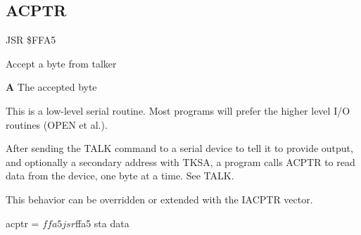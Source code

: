 \subsection{ACPTR}
\label{KERNAL Jump Table!ACPTR}
\begin{description}[leftmargin=2cm,style=nextline]
    \item [Address:] JSR \$FFA5
    \item [Description:] Accept a byte from talker
    \item [Outputs:]
        \textbf{A} The accepted byte
    \item [Remarks:]
        This is a low-level serial routine. Most programs will prefer the higher level I/O routines (OPEN et al.).

        After sending the TALK command to a serial device to tell it to provide output, and optionally a secondary address with TKSA, a program calls ACPTR to read data from the device, one byte at a time. See TALK.

        This behavior can be overridden or extended with the IACPTR vector.
    \item [Example:]
        \begin{asmcode}
acptr = $ffa5

    jsr $ffa5
    sta data
        \end{asmcode}
\end{description}



\newpage
